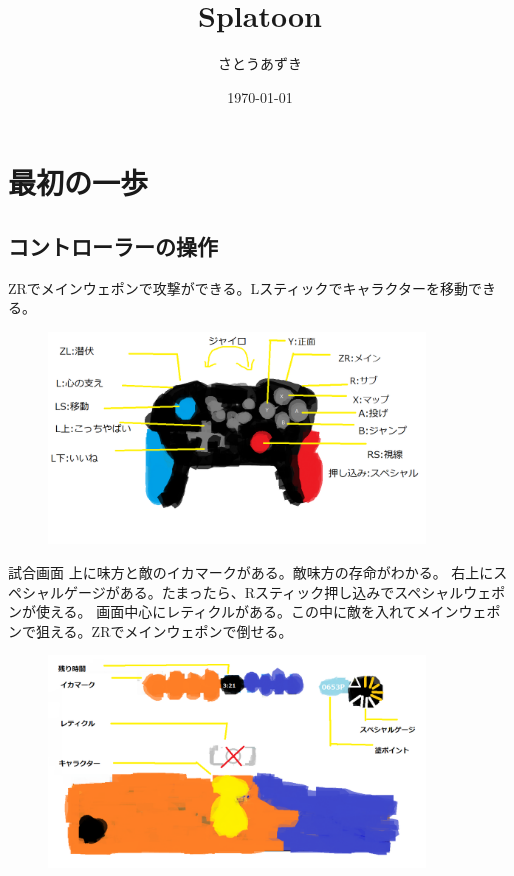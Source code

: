 \documentclass[a4paper,11pt]{jsbook}
\begin{document}
\title{Splatoon}
\author{さとうあずき}
\date{\today}
\maketitle
\tableofcontents


\chapter{最初の一歩}
\section{コントローラーの操作}
ZRでメインウェポンで攻撃ができる。Lスティックでキャラクターを移動できる。
\begin{figure}
  \begin{center}
    \includegraphics[width=10cm]{resoource/Controller_button.png}
  \end{center}
\end{figure}

試合画面
上に味方と敵のイカマークがある。敵味方の存命がわかる。
右上にスペシャルゲージがある。たまったら、Rスティック押し込みでスペシャルウェポンが使える。
画面中心にレティクルがある。この中に敵を入れてメインウェポンで狙える。ZRでメインウェポンで倒せる。
\begin{figure}
  \begin{center}
    \includegraphics[width=10cm]{resoource/gamescreenframe.png}
  \end{center}
\end{figure}
\end{document}
